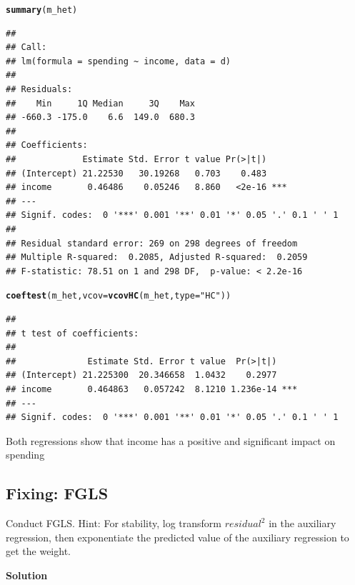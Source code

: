 \documentclass{article}\usepackage[]{graphicx}\usepackage[]{color}
\makeatletter
\newcommand{\hlstr}[1]{\textcolor[rgb]{0.192,0.494,0.8}{#1}}%
\newcommand{\hlstd}[1]{\textcolor[rgb]{0.345,0.345,0.345}{#1}}%
\newcommand{\hlkwc}[1]{\textcolor[rgb]{0.333,0.667,0.333}{#1}}%
\newcommand{\hlkwd}[1]{\textcolor[rgb]{0.737,0.353,0.396}{\textbf{#1}}}%
\newenvironment{kframe}{%
 \def\at@end@of@kframe{}%
 \ifinner\ifhmode%
  \def\at@end@of@kframe{\end{minipage}}%
  \begin{minipage}{\columnwidth}%
 \fi\fi%
 \def\FrameCommand##1{\hskip\@totalleftmargin \hskip-\fboxsep
 \colorbox{shadecolor}{##1}\hskip-\fboxsep
     \hskip-\linewidth \hskip-\@totalleftmargin \hskip\columnwidth}%
 \MakeFramed {\advance\hsize-\width
   \@totalleftmargin\z@ \linewidth\hsize
   \@setminipage}}%
 {\par\unskip\endMakeFramed%
 \at@end@of@kframe}
\newenvironment{knitrout}{}{} %
\makeatother
\begin{document}
\begin{knitrout}
\color{fgcolor}\begin{kframe}
\begin{alltt}
\hlkwd{summary}\hlstd{(m_het)}
\end{alltt}
\begin{verbatim}
## 
## Call:
## lm(formula = spending ~ income, data = d)
## 
## Residuals:
##    Min     1Q Median     3Q    Max 
## -660.3 -175.0    6.6  149.0  680.3 
## 
## Coefficients:
##             Estimate Std. Error t value Pr(>|t|)    
## (Intercept) 21.22530   30.19268   0.703    0.483    
## income       0.46486    0.05246   8.860   <2e-16 ***
## ---
## Signif. codes:  0 '***' 0.001 '**' 0.01 '*' 0.05 '.' 0.1 ' ' 1
## 
## Residual standard error: 269 on 298 degrees of freedom
## Multiple R-squared:  0.2085,	Adjusted R-squared:  0.2059 
## F-statistic: 78.51 on 1 and 298 DF,  p-value: < 2.2e-16
\end{verbatim}
\begin{alltt}
\hlkwd{coeftest}\hlstd{(m_het,} \hlkwc{vcov} \hlstd{=} \hlkwd{vcovHC}\hlstd{(m_het,} \hlkwc{type} \hlstd{=} \hlstr{"HC"}\hlstd{))}
\end{alltt}
\begin{verbatim}
## 
## t test of coefficients:
## 
##              Estimate Std. Error t value  Pr(>|t|)    
## (Intercept) 21.225300  20.346658  1.0432    0.2977    
## income       0.464863   0.057242  8.1210 1.236e-14 ***
## ---
## Signif. codes:  0 '***' 0.001 '**' 0.01 '*' 0.05 '.' 0.1 ' ' 1
\end{verbatim}
\end{kframe}
\end{knitrout}

Both regressions show that income has a positive and significant impact on spending

\subsection{Fixing: FGLS}

Conduct FGLS. Hint: For stability, log transform $residual^2$ in the auxiliary regression, then exponentiate the predicted value of the auxiliary regression to get the weight.

\textbf{Solution}
\end{document}

